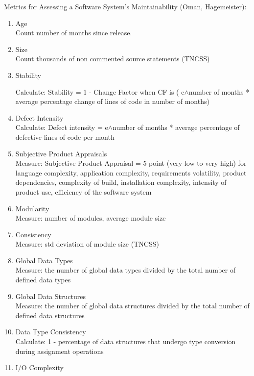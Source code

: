 \documentclass{article}
\begin{document}
Metrics for Assessing a Software System's Maintainability (Oman, Hagemeister):
\begin{enumerate}
\item Age\\

Count number of months since release.
\item Size\\

Count thousands of non commented source statements (TNCSS)
\item Stability 

Calculate: Stability = 1 - Change Factor when CF is ( e$\land$number of months * average percentage change of lines of code in number of months)
\item Defect Intensity\\

Calculate: Defect intensity =  e$\land$number of months * average percentage of defective lines of code per month
\item Subjective Product Appraisals\\

Measure: Subjective Product Appraisal = 5 point (very low to very high) for language complexity, application complexity, requirements volatility, product dependencies, complexity of build, installation complexity, intensity of product use, efficiency of the software system
\item Modularity\\

Measure: number of modules, average module size
\item Consistency\\

Measure: std deviation of module size (TNCSS)
\item Global Data Types\\

Measure: the number of global data types divided by the total number of defined data types
\item Global Data Structures\\

Measure: the number of global data structures divided by the total number of defined data structures
\item Data Type Consistency\\

Calculate: 1 - percentage of data structures that undergo type conversion during assignment operations
\item I/O Complexity\\


\end{enumerate}
\end{document}
